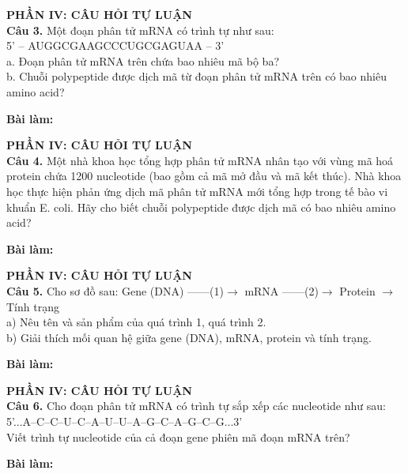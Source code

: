 \documentclass{article}
\begin{document}
\begin{minipage}[t][14.4cm][t]{\linewidth}
\fontsize{23}{31}\selectfont
{\color{brandGreen}\textbf{PHẦN IV: CÂU HỎI TỰ LUẬN}\\[10pt]}
\textbf{Câu 3.} Một đoạn phân tử mRNA có trình tự như sau:\\[6pt]5' – AUGGCGAAGCCCUGCGAGUAA – 3'\\[6pt]a. Đoạn phân tử mRNA trên chứa bao nhiêu mã bộ ba?\\[6pt]b. Chuỗi polypeptide được dịch mã từ đoạn phân tử mRNA trên có bao nhiêu amino acid?
\vspace{14pt}

\textbf{Bài làm:}
\vfill
\end{minipage}
\newpage


\begin{minipage}[t][14.4cm][t]{\linewidth}
\fontsize{23}{31}\selectfont
{\color{brandGreen}\textbf{PHẦN IV: CÂU HỎI TỰ LUẬN}\\[10pt]}
\textbf{Câu 4.} Một nhà khoa học tổng hợp phân tử mRNA nhân tạo với vùng mã hoá protein chứa 1200 nucleotide (bao gồm cả mã mở đầu và mã kết thúc). Nhà khoa học thực hiện phản ứng dịch mã phân tử mRNA mới tổng hợp trong tế bào vi khuẩn E. coli. Hãy cho biết chuỗi polypeptide được dịch mã có bao nhiêu amino acid?
\vspace{14pt}

\textbf{Bài làm:}
\vfill
\end{minipage}
\newpage


\begin{minipage}[t][14.4cm][t]{\linewidth}
\fontsize{23}{31}\selectfont
{\color{brandGreen}\textbf{PHẦN IV: CÂU HỎI TỰ LUẬN}\\[10pt]}
\textbf{Câu 5.} Cho sơ đồ sau: Gene (DNA) ——(1)$\longrightarrow$ mRNA ——(2)$\longrightarrow$ Protein $\longrightarrow$ Tính trạng\\[6pt]a) Nêu tên và sản phẩm của quá trình 1, quá trình 2.\\[6pt]b) Giải thích mối quan hệ giữa gene (DNA), mRNA, protein và tính trạng.
\vspace{14pt}

\textbf{Bài làm:}
\vfill
\end{minipage}
\newpage


\begin{minipage}[t][14.4cm][t]{\linewidth}
\fontsize{26}{35}\selectfont
{\color{brandGreen}\textbf{PHẦN IV: CÂU HỎI TỰ LUẬN}\\[10pt]}
\textbf{Câu 6.} Cho đoạn phân tử mRNA có trình tự sắp xếp các nucleotide như sau:\\[6pt]5'...A–C–C–U–C–A–U–U–A–G–C–A–G–C–G...3'\\[6pt]Viết trình tự nucleotide của cả đoạn gene phiên mã đoạn mRNA trên?
\vspace{14pt}

\textbf{Bài làm:}
\vfill
\end{minipage}
\newpage
\end{document}

